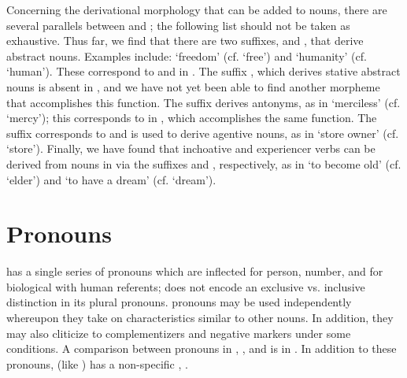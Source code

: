 \documentclass[output=paper,modfonts,nonflat,
colorlinks, citecolor=brown,
draftmode
]{langsci/langscibook}
\begin{document}
 Concerning the derivational morphology that can be added to nouns, there are several parallels between  and ; the following list should not be taken as exhaustive. Thus far, we find that there are two  suffixes, \mbox{} and , that derive abstract nouns. Examples include:  `freedom' (cf.  `free') and  `humanity' (cf.  `human'). These correspond to \mbox{} and  in . The  suffix , which derives stative abstract nouns is absent in , and we have not yet been able to find another morpheme that accomplishes this function. The  suffix  derives antonyms, as in  `merciless' (cf.  `mercy'); this corresponds to  in , which accomplishes the same function. The  suffix  corresponds to   and is used to derive agentive nouns, as in  `store owner' (cf.  `store'). Finally, we have found that inchoative and experiencer verbs can be derived from nouns in  via the suffixes  and , respectively, as in  `to become old' (cf.  `elder') and  `to have a dream' (cf.  `dream'). 
 
 \section{Pronouns}
 
  has a single series of  pronouns which are inflected for person, number, and for biological  with human referents;  does not encode an exclusive vs. inclusive distinction in its  plural  pronouns.   pronouns may be used independently whereupon they take on characteristics similar to other nouns. In addition, they may also cliticize to complementizers and negative markers under some conditions. A comparison between  pronouns in , , and  is in . In addition to these  pronouns,  (like ) has a non-specific , .
 
\end{document}
